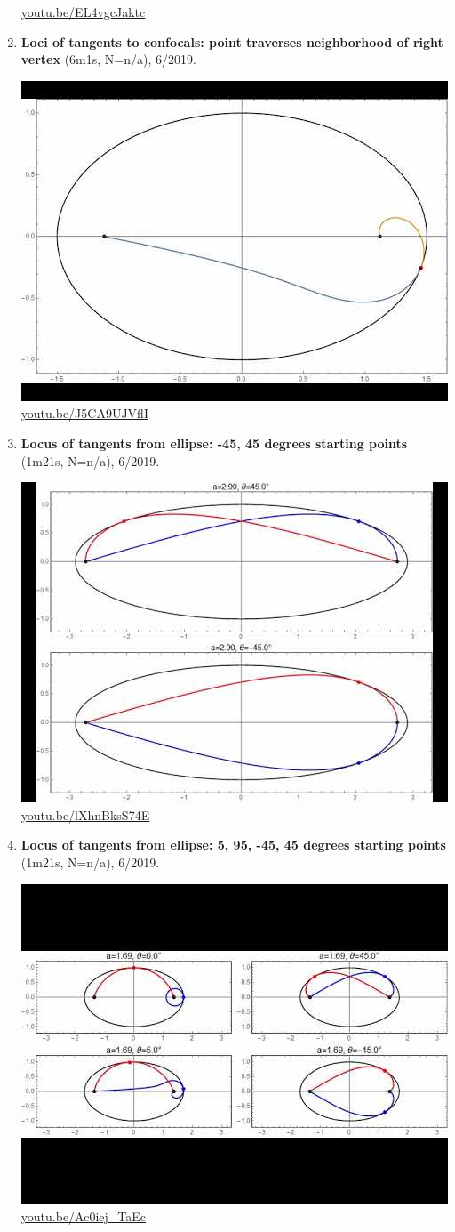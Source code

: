 \documentclass[12pt]{amsart}
\begin{document}
\begin{enumerate}[resume]
\begin{center}
\href{https://youtu.be/EL4vgcJaktc}{\url{youtu.be/EL4vgcJaktc}}\end{center}
% 
\item \textbf{Loci of tangents to confocals: point traverses neighborhood of right vertex} (6m1s, N=n/a), 6/2019. 
\begin{center}\includegraphics[width=.5\textwidth]{pics/J5CA9UJVflI.jpg} \\ 
\href{https://youtu.be/J5CA9UJVflI}{\url{youtu.be/J5CA9UJVflI}}\end{center}
% 
\item \textbf{Locus of tangents from ellipse: -45, 45 degrees starting points} (1m21s, N=n/a), 6/2019. 
\begin{center}\includegraphics[width=.5\textwidth]{pics/lXhnBksS74E.jpg} \\ 
\href{https://youtu.be/lXhnBksS74E}{\url{youtu.be/lXhnBksS74E}}\end{center}
% 
\item \textbf{Locus of tangents from ellipse: 5, 95, -45, 45 degrees starting points} (1m21s, N=n/a), 6/2019. 
\begin{center}\includegraphics[width=.5\textwidth]{pics/Ac0iej_TaEc.jpg} \\ 
\href{https://youtu.be/Ac0iej_TaEc}{\url{youtu.be/Ac0iej\_TaEc}}\end{center}
% 
\end{enumerate}
\end{document}
